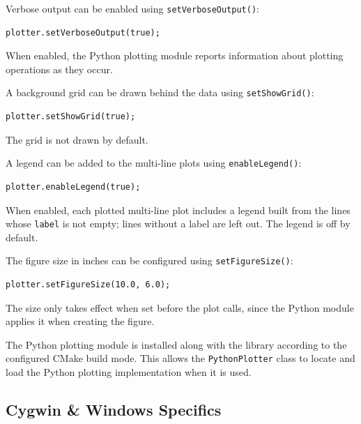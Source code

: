 Verbose output can be enabled using \texttt{setVerboseOutput()}:
\begin{lstlisting}[style=cppstyle]
plotter.setVerboseOutput(true);
\end{lstlisting}
When enabled, the Python plotting module reports information about plotting operations as they occur.

A background grid can be drawn behind the data using \texttt{setShowGrid()}:
\begin{lstlisting}[style=cppstyle]
plotter.setShowGrid(true);
\end{lstlisting}
The grid is not drawn by default.

A legend can be added to the multi-line plots using \texttt{enableLegend()}:
\begin{lstlisting}[style=cppstyle]
plotter.enableLegend(true);
\end{lstlisting}
When enabled, each plotted multi-line plot includes a legend built from the lines whose \texttt{label} is not empty; lines without a label are left out. The legend is off by default.

The figure size in inches can be configured using \texttt{setFigureSize()}:
\begin{lstlisting}[style=cppstyle]
plotter.setFigureSize(10.0, 6.0);
\end{lstlisting}
The size only takes effect when set before the plot calls, since the Python module applies it when creating the figure.

The Python plotting module is installed along with the library according to the configured CMake build mode. This allows the \texttt{PythonPlotter} class to locate and load the Python plotting implementation when it is used.

\subsection{Cygwin \& Windows Specifics}


